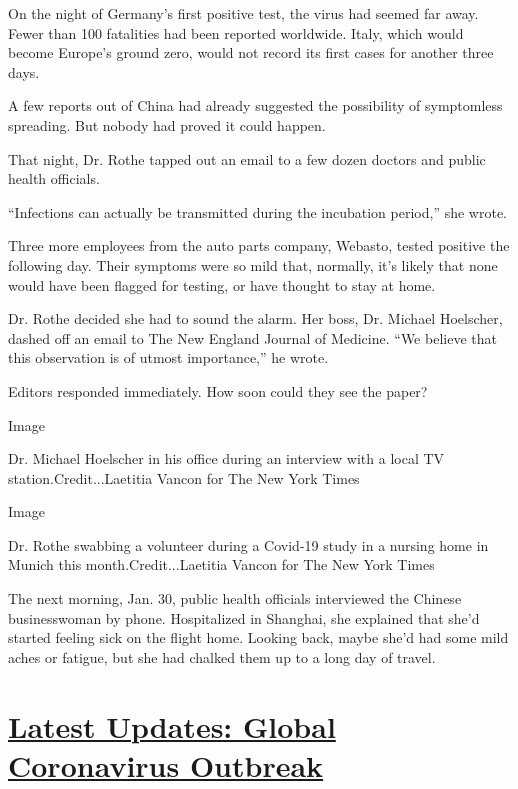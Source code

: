 On the night of Germany's first positive test, the virus had seemed far
away. Fewer than 100 fatalities had been reported worldwide. Italy,
which would become Europe's ground zero, would not record its first
cases for another three days.

A few reports out of China had already suggested the possibility of
symptomless spreading. But nobody had proved it could happen.

That night, Dr. Rothe tapped out an email to a few dozen doctors and
public health officials.

``Infections can actually be transmitted during the incubation period,''
she wrote.

Three more employees from the auto parts company, Webasto, tested
positive the following day. Their symptoms were so mild that, normally,
it's likely that none would have been flagged for testing, or have
thought to stay at home.

Dr. Rothe decided she had to sound the alarm. Her boss, Dr. Michael
Hoelscher, dashed off an email to The New England Journal of Medicine.
``We believe that this observation is of utmost importance,'' he wrote.

Editors responded immediately. How soon could they see the paper?

Image

Dr. Michael Hoelscher in his office during an interview with a local TV
station.Credit...Laetitia Vancon for The New York Times

Image

Dr. Rothe swabbing a volunteer during a Covid-19 study in a nursing home
in Munich this month.Credit...Laetitia Vancon for The New York Times

The next morning, Jan. 30, public health officials interviewed the
Chinese businesswoman by phone. Hospitalized in Shanghai, she explained
that she'd started feeling sick on the flight home. Looking back, maybe
she'd had some mild aches or fatigue, but she had chalked them up to a
long day of travel.

\hypertarget{latest-updates-global-coronavirus-outbreak}{%
\section{\texorpdfstring{\href{https://www.nytimes.com/2020/08/01/world/coronavirus-covid-19.html?action=click\&pgtype=Article\&state=default\&region=MAIN_CONTENT_1\&context=storylines_live_updates}{Latest
Updates: Global Coronavirus
Outbreak}}{Latest Updates: Global Coronavirus Outbreak}}\label{latest-updates-global-coronavirus-outbreak}}


